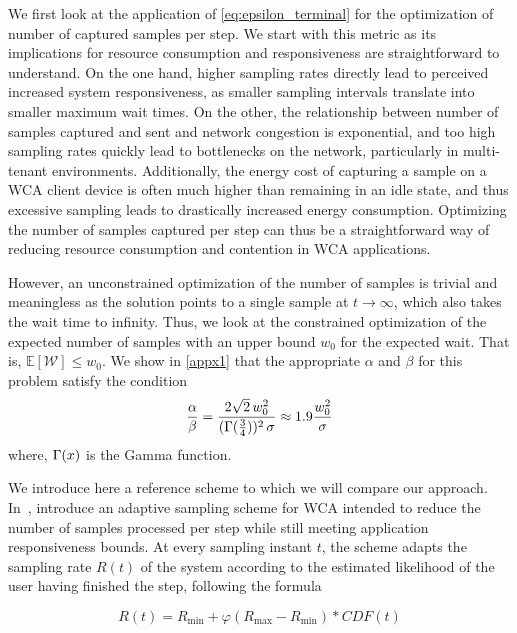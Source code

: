 We first look at the application of \cref{eq:epsilon_terminal} for the optimization of number of captured samples per step.
We start with this metric as its implications for resource consumption and responsiveness are straightforward to understand.
On the one hand, higher sampling rates directly lead to perceived increased system responsiveness, as smaller sampling intervals translate into smaller maximum wait times.
On the other, the relationship between number of samples captured and sent and network congestion is exponential, and too high sampling rates quickly lead to bottlenecks on the network, particularly in multi-tenant environments.
Additionally, the energy cost of capturing a sample on a \ac{WCA} client device is often much higher than remaining in an idle state, and thus excessive sampling leads to drastically increased energy consumption.
Optimizing the number of samples captured per step can thus be a straightforward way of reducing resource consumption and contention in \ac{WCA} applications.

However, an unconstrained optimization of the number of samples is trivial and meaningless as the solution points to a single sample at $t\!\rightarrow\!\infty$, which also takes the wait time to infinity.
Thus, we look at the constrained optimization of the expected number of samples with an upper bound $w_0$ for the expected wait.
That is, $\mathbb{E}[\mathcal{W}]\!\leq\!w_0$. We show in \cref{appx1} that the appropriate $\alpha$ and $\beta$ for this problem satisfy the condition
\begin{alignat}{1}\label{eq:optimization:sampling}
\frac{\alpha}{\beta}=\frac{2\sqrt{2}\,w_0^2}{(\mathlarger{\Gamma}(\tfrac{3}{4}))^2\,\sigma}\approx1.9\frac{w_0^2}{\sigma}
\end{alignat}
where, $\mathlarger{\Gamma}(x)$ is the Gamma function.

\medskip

We introduce here a reference scheme to which we will compare our approach.
In~\cite{Wang2019Towards}, \citeauthor{Wang2019Towards} introduce an adaptive sampling scheme for \ac{WCA} intended to reduce the number of samples processed per step while still meeting application responsiveness bounds.
At every sampling instant \( t \), the scheme adapts the sampling rate \( R(t) \) of the system according to the estimated likelihood of the user having finished the step,
following the formula 

\begin{equation}
    R(t) = R_\text{min} + \varphi\left( R_\text{max} - R_\text{min} \right) * CDF(t)
\end{equation}

